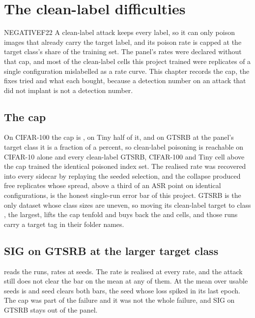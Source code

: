 \documentclass[../main.tex]{subfiles}
\begin{document}
\section{The clean-label difficulties}
\label{sec:cleanlabel}

\begin{claim}{NEGATIVE}{F22}
A clean-label attack keeps every label, so it can only poison images that already carry the target label, and its poison rate is capped at the target class's share of the training set. The panel's rates were declared without that cap, and most of the clean-label cells this project trained were replicates of a single configuration mislabelled as a rate curve. This chapter records the cap, the fixes tried and what each bought, because a detection number on an attack that did not implant is not a detection number.
\end{claim}

\subsection{The cap}

On CIFAR-100 the cap is \PanelRateLow{}, on Tiny half of it, and on GTSRB at the panel's target class it is a fraction of a percent, so \PanelRateHigh{} clean-label poisoning is reachable on CIFAR-10 alone and every clean-label GTSRB, CIFAR-100 and Tiny cell above the cap trained the identical poisoned index set. The realised rate was recovered into every sidecar by replaying the seeded selection, and the collapse produced free replicates whose spread, above a third of an ASR point on identical configurations, is the honest single-run error bar of this project. GTSRB is the only dataset whose class sizes are uneven, so moving its clean-label target to class \SigGtsrbTargetClass{}, the largest, lifts the cap tenfold and buys back the \PanelRateLow{} and \PanelRateMid{} cells, and those runs carry a target tag in their folder names.

\subsection{SIG on GTSRB at the larger target class}

 reads the \SigGtsrbRuns{} runs, \SigGtsrbRates{} rates at \SigGtsrbSeeds{} seeds. The rate is realised at every rate, and the attack still does not clear the bar on the mean at any of them. At \PanelRateMid{} the mean over \SigGtsrbTlOneFivePercentSeeds{} usable seeds is \SigGtsrbTlOneFivePercentMeanAsr{} and \SigGtsrbTlOneFivePercentSeedsClearing{} seed clears both bars, the seed whose loss spiked in its last epoch. The cap was part of the failure and it was not the whole failure, and SIG on GTSRB stays out of the panel.
\end{document}
